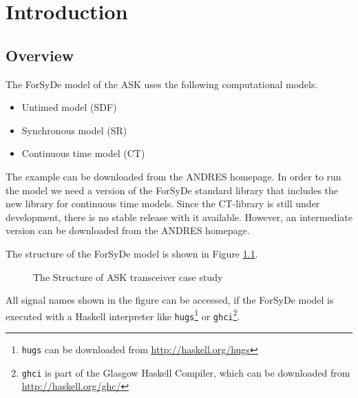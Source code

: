 \chapter{Introduction}

\section{Overview}

The ForSyDe model of the ASK uses the following computational models.

\begin{itemize}
\item Untimed model (SDF)
\item Synchronous model (SR)
\item Continuous time model (CT) 
\end{itemize}

The example can be downloaded from the ANDRES homepage. In order to run the model we need a version of the ForSyDe standard library that includes the new library for continuous time models. Since the CT-library is still under development, there is no stable release with it available. However, an intermediate version can be downloaded from the ANDRES homepage. 

The structure of the ForSyDe model is shown in Figure \ref{fig:Overview}.

\begin{figure}[htb!]
\centering%
\caption{The Structure of ASK transceiver case study}
\label{fig:Overview}
\end{figure}

All signal names shown in the figure can be accessed, if the ForSyDe model is executed with a Haskell interpreter like \texttt{hugs}\footnote{\texttt{hugs} can be downloaded from \url{http://haskell.org/hugs}} or \texttt{ghci}\footnote{\texttt{ghci} is part of the Glasgow Haskell Compiler, which can be downloaded from \url{http://haskell.org/ghc/}}. 


